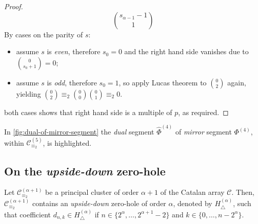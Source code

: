 \begin{proof}
\begin{displaymath}
        {{s_{\alpha-1}-1}\choose{1}}
    \end{displaymath}
    By cases on the parity of $s$:
    \begin{itemize}
        \item assume $s$ is \emph{even}, therefore $s_{0}=0$ and the right hand side vanishes due to ${{0}\choose{s_{0}+1}}=0$;
        \item assume $s$ is \emph{odd}, therefore $s_{0}=1$, so apply Lucas theorem to ${{0}\choose{2}}$ again,
            yielding ${{0}\choose{2}}\equiv_{2}{{0}\choose{0}}{{0}\choose{1}}\equiv_{2}0$.
    \end{itemize}
    both cases shows that right hand side is a multiple of $p$, as required.
\end{proof}


In \autoref{fig:dual-of-mirror-segment} the \emph{dual} segment $\hat{\Phi}^{(4)}$
    of \emph{mirror} segment $\Phi^{(4)}$, within $\mathcal{C}_{\equiv_{2}}^{(5)}$, is highlighted.

\subsection{On the \emph{upside-down} zero-hole}

\begin{theorem}
    Let $\mathcal{C}_{\equiv_{2}}^{(\alpha+1)}$ be a principal cluster 
    of order $\alpha+1$ of the Catalan array $\mathcal{C}$. Then, $\mathcal{C}_{\equiv_{2}}^{(\alpha+1)}$
    contains an \emph{upside-down} zero-hole of order $\alpha$, denoted by $H_{\bigtriangleup}^{({\alpha})}$, 
    such that coefficient $d_{n,k}\in H_{\bigtriangleup}^{({\alpha})}$ if 
    $n\in\lbrace 2^{{\alpha}},\ldots,2^{{\alpha}+1}-2\rbrace$ and 
    $k\in\lbrace 0,\ldots, n-2^{{\alpha}}\rbrace$. 
    \label{thm:upside:down:zero:hole}
\end{theorem}


